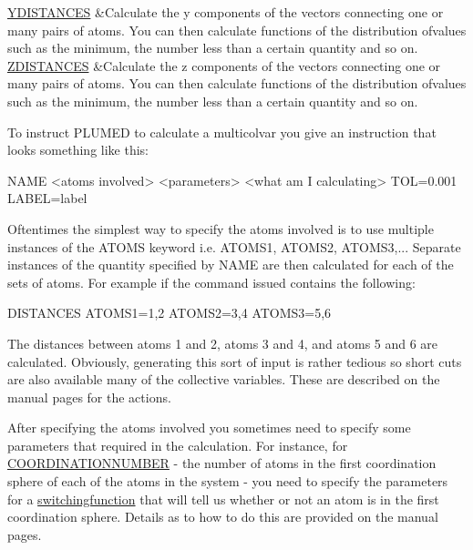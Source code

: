 \begin{TabularC}{2}
\hyperlink{YDISTANCES}{Y\+D\+I\+S\+T\+A\+N\+C\+E\+S}  &Calculate the y components of the vectors connecting one or many pairs of atoms. You can then calculate functions of the distribution ofvalues such as the minimum, the number less than a certain quantity and so on.  \\
\hyperlink{ZDISTANCES}{Z\+D\+I\+S\+T\+A\+N\+C\+E\+S}  &Calculate the z components of the vectors connecting one or many pairs of atoms. You can then calculate functions of the distribution ofvalues such as the minimum, the number less than a certain quantity and so on.  \\
\end{TabularC}


To instruct P\+L\+U\+M\+E\+D to calculate a multicolvar you give an instruction that looks something like this\+:

\begin{DoxyVerb}NAME <atoms involved> <parameters> <what am I calculating> TOL=0.001 LABEL=label
\end{DoxyVerb}


Oftentimes the simplest way to specify the atoms involved is to use multiple instances of the A\+T\+O\+M\+S keyword i.\+e. A\+T\+O\+M\+S1, A\+T\+O\+M\+S2, A\+T\+O\+M\+S3,... Separate instances of the quantity specified by N\+A\+M\+E are then calculated for each of the sets of atoms. For example if the command issued contains the following\+:

\begin{DoxyVerb}DISTANCES ATOMS1=1,2 ATOMS2=3,4 ATOMS3=5,6
\end{DoxyVerb}


The distances between atoms 1 and 2, atoms 3 and 4, and atoms 5 and 6 are calculated. Obviously, generating this sort of input is rather tedious so short cuts are also available many of the collective variables. These are described on the manual pages for the actions.

After specifying the atoms involved you sometimes need to specify some parameters that required in the calculation. For instance, for \hyperlink{COORDINATIONNUMBER}{C\+O\+O\+R\+D\+I\+N\+A\+T\+I\+O\+N\+N\+U\+M\+B\+E\+R} -\/ the number of atoms in the first coordination sphere of each of the atoms in the system -\/ you need to specify the parameters for a \hyperlink{switchingfunction}{switchingfunction} that will tell us whether or not an atom is in the first coordination sphere. Details as to how to do this are provided on the manual pages.

